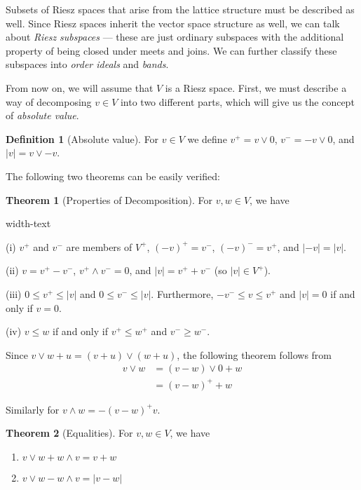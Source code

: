 \documentclass[letterpaper,10pt,oneside,onecolumn,reqno]{amsart}
\theoremstyle{definition}
\newtheorem{thm}{Theorem}
\newtheorem{defn}{Definition}
\newcommand{\meet}{\wedge}
\newcommand{\join}{\vee}
\begin{document}
Subsets of Riesz spaces that arise from the lattice structure must be
described as well. Since Riesz spaces inherit the vector space
structure as well, we can talk about \emph{Riesz subspaces} --- these
are just ordinary subspaces with the additional property of being
closed under meets and joins. We can further classify these subspaces
into \emph{order ideals} and \emph{bands}.

From now on, we will assume that $V$ is a Riesz space. First, we must
describe a way of decomposing $v \in V$ into two different parts,
which will give us the concept of \emph{absolute value}.

\begin{framed}
  \begin{defn}[Absolute value]\label{def:7}
    For $v \in V$ we define $v^+=v \join 0$, $v^-=-v \join 0$, and
    $|v| = v \join -v$.
  \end{defn}


The following two theorems can be easily verified:

\begin{thm}[Properties of Decomposition]
  \label{thr:1}
  For $v,w \in V$, we have
  \begin{deflist}{width-text}
  \item
  \item[(i)] $v^+$ and $v^-$ are members of $V^+$, ${(-v)}^+=v^-$,
    ${(-v)}^-=v^+$, and $|-v|=|v|$.
  \item[(ii)] $v = v^+ - v^-$, $v^+ \meet v^-=0$, and $|v| = v^++v^-$
    (so $|v| \in V^+$).
  \item[(iii)] $0 \leq v^+ \leq |v|$ and $0 \leq v^- \leq
    |v|$. Furthermore, $-v^- \leq v \leq v^+$ and $|v|=0$ if and only
    if $v=0$.
  \item[(iv)] $v \leq w$ if and only if $v^+ \leq w^+$ and $v^- \geq
    w^-$.
  \end{deflist}
\end{thm}
Since $v \join w + u = (v + u) \join (w + u)$, the following theorem
follows from
\begin{align*}
  v \join w &= (v-w) \join 0 + w \\
  &= {(v-w)}^+ + w
\end{align*}

Similarly for $v \meet w = -{(v-w)}^+ v$.

\begin{thm}[Equalities]\label{thr:2}
  For $v,w \in V$, we have
  \begin{enumerate}
  \item\label{item:1} $v \join w + w \meet v = v + w$
  \item\label{item:2} $v \join w - w \meet v = |v - w|$
  \end{enumerate}
\end{thm}

\end{framed}
\end{document}
